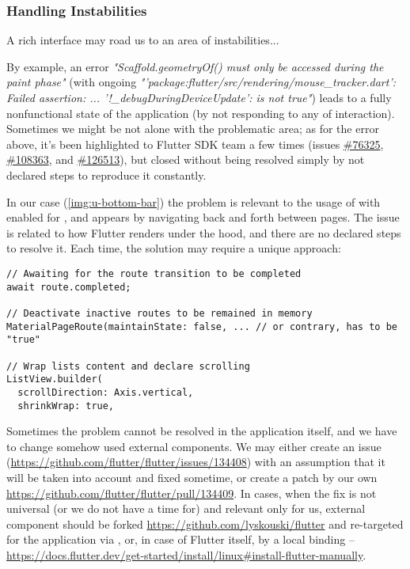 \subsubsection{Handling Instabilities}

A rich interface may road us to an area of instabilities...

By example, an error \emph{"Scaffold.geometryOf() must only be accessed during the paint phase"} (with ongoing 
\emph{"'package:flutter/src/rendering/mouse\_tracker.dart': Failed assertion: ... '!\_debugDuringDeviceUpdate': 
is not true"}) leads to a fully nonfunctional state  of the application (by not responding to any of interaction).
Sometimes we might be not alone with the problematic area; as for the error above, it's been highlighted to Flutter 
SDK team a few times (issues \href{https://github.com/flutter/flutter/issues/76325}{\#76325},
\href{https://github.com/flutter/flutter/issues/108363}{\#108363}, and
\href{https://github.com/flutter/flutter/issues/126513}{\#126513}), but closed without being resolved simply by not 
declared steps to reproduce it constantly.


In our case (\cref{img:u-bottom-bar}) the problem is relevant to the usage of  
with enabled  for , and appears by navigating back and forth between pages. The issue 
is related to how Flutter renders under the hood, and there are no declared steps to resolve it. Each time, the 
solution may require a unique approach:

\begin{lstlisting}
// Awaiting for the route transition to be completed
await route.completed;

// Deactivate inactive routes to be remained in memory
MaterialPageRoute(maintainState: false, ... // or contrary, has to be "true"

// Wrap lists content and declare scrolling
ListView.builder(
  scrollDirection: Axis.vertical,
  shrinkWrap: true,
\end{lstlisting}

Sometimes the problem cannot be resolved in the application itself, and we have to change somehow used external 
components. We may either create an issue 
(\href{https://github.com/flutter/flutter/issues/134408}{https://github.com/flutter/flutter/issues/134408}) 
with an assumption that it will be taken into account and fixed sometime, or create a patch by our own 
\href{https://github.com/flutter/flutter/pull/134409}{https://github.com/flutter/flutter/pull/134409}. In cases, when 
the fix is not universal (or we do not have a time for) and relevant only for us, external component should be forked 
\href{https://github.com/lyskouski/flutter}{https://github.com/lyskouski/flutter} and re-targeted for the application
via , or, in case of Flutter itself, by a local binding -- 
\href{https://docs.flutter.dev/get-started/install/linux#install-flutter-manually}{https://docs.flutter.dev/get-started/install/linux\#install-flutter-manually}.
